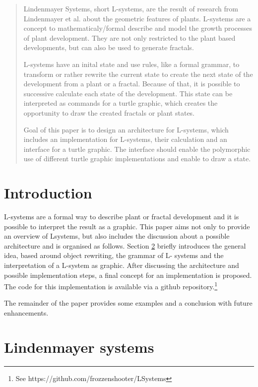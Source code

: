 \documentclass[english]{cpp-hmwk}
\begin{document}

\begin{abstract}
Lindenmayer Systems, short L-systems, are the result of research from Lindenmayer et al.\cite{prusinkiewiczp.lindenmayera.2004} about the geometric features of plants.
L-systems are a concept to mathematicaly/formal describe and model the growth processes of plant development. They are not only restricted to the plant based developments, but can also be used to generate fractals.

L-systems have an inital state and use rules, like a formal grammar, to transform or rather rewrite the current state to create the next state of the development from a plant or a fractal.
Because of that, it is possible to successive calculate each state of the development.
This state can be interpreted as commands for a turtle graphic, which creates the opportunity to draw the created fractals or plant states. 

Goal of this paper is to design an architecture for L-systems, which includes an implementation for L-systems, their calculation and an interface for a turtle graphic. The interface should enable the polymorphic use of different turtle graphic implementations and enable to draw a state.
\end{abstract}

\pagebreak
\section{Introduction}
L-systems are a formal way to describe plant or fractal development and it is possible to interpret the result as a graphic. This paper aims not only to provide an overview of Lsystems, but also includes the discussion about a possible architecture and is organised as follows. Section \ref{section:lindenmayer} briefly introduces the general idea, based around object rewriting, the grammar of L- systems and the interpretation of a L-system as graphic.
After discussing the architecture and possible implementation steps, a final concept for an implementation is proposed. The code for this implementation is available via a github repository.\footnote{See https://github.com/frozzenshooter/LSystems}

The remainder of the paper provides some examples and a conclusion with future enhancements.

\section{Lindenmayer systems}
\label{section:lindenmayer}
\end{document}
